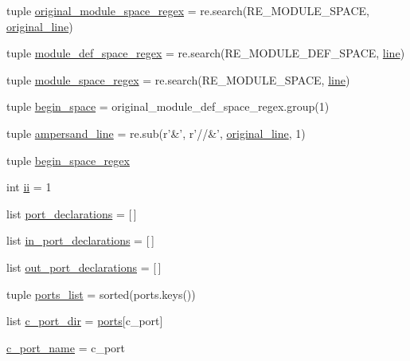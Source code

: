 \begin{DoxyCompactItemize}
tuple \hyperlink{namespaceveripy_a3816a72d0c349d678a422f19923a5266}{original\-\_\-module\-\_\-space\-\_\-regex} = re.\-search(R\-E\-\_\-\-M\-O\-D\-U\-L\-E\-\_\-\-S\-P\-A\-C\-E, \hyperlink{namespaceveripy_ab15a6bb1f76d3b0db1c63066479489eb}{original\-\_\-line})
\item 
tuple \hyperlink{namespaceveripy_a854da7683905a3b5cbf73256a6be33b4}{module\-\_\-def\-\_\-space\-\_\-regex} = re.\-search(R\-E\-\_\-\-M\-O\-D\-U\-L\-E\-\_\-\-D\-E\-F\-\_\-\-S\-P\-A\-C\-E, \hyperlink{namespaceveripy_a3cf9cf94513841f0d65d3081b08a55cc}{line})
\item 
tuple \hyperlink{namespaceveripy_ae0aec319e1f286eaeeb8ec758137f7a9}{module\-\_\-space\-\_\-regex} = re.\-search(R\-E\-\_\-\-M\-O\-D\-U\-L\-E\-\_\-\-S\-P\-A\-C\-E, \hyperlink{namespaceveripy_a3cf9cf94513841f0d65d3081b08a55cc}{line})
\item 
tuple \hyperlink{namespaceveripy_ae247f78446c024b1e35787cb67a44b2b}{begin\-\_\-space} = original\-\_\-module\-\_\-def\-\_\-space\-\_\-regex.\-group(1)
\item 
tuple \hyperlink{namespaceveripy_afea06b60383bdad409732711cafd8d5e}{ampersand\-\_\-line} = re.\-sub(r'\&', r'//\&', \hyperlink{namespaceveripy_ab15a6bb1f76d3b0db1c63066479489eb}{original\-\_\-line}, 1)
\item 
tuple \hyperlink{namespaceveripy_a1185ea61fff03e646c641f6d6caf3bdb}{begin\-\_\-space\-\_\-regex}
\item 
int \hyperlink{namespaceveripy_a1ee51ba6e57cf9cc093a45eefcdb032e}{ii} = 1
\item 
list \hyperlink{namespaceveripy_a99fccb7245b05a502fd01a6cd7ed1c22}{port\-\_\-declarations} = \mbox{[}$\,$\mbox{]}
\item 
list \hyperlink{namespaceveripy_a1d80c92b030a306a025b82c2f229acac}{in\-\_\-port\-\_\-declarations} = \mbox{[}$\,$\mbox{]}
\item 
list \hyperlink{namespaceveripy_a2aa010b557e59bc1d12efd8479d6a242}{out\-\_\-port\-\_\-declarations} = \mbox{[}$\,$\mbox{]}
\item 
tuple \hyperlink{namespaceveripy_ac40d1f9532d5dad37c9e4457b28b8298}{ports\-\_\-list} = sorted(ports.\-keys())
\item 
list \hyperlink{namespaceveripy_aa17b83309ed85682ee4b3d4da58a9bfc}{c\-\_\-port\-\_\-dir} = \hyperlink{namespaceveripy_ad0eff554700802b50170079f6544c06d}{ports}\mbox{[}c\-\_\-port\mbox{]}
\item 
\hyperlink{namespaceveripy_aead00c96f8f701052f787bc35a89ca39}{c\-\_\-port\-\_\-name} = c\-\_\-port
\item 

\end{DoxyCompactItemize}
